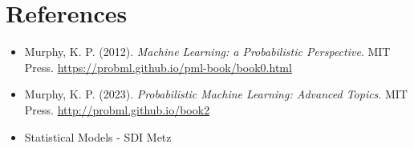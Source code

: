 \documentclass[12pt, a4paper]{article}
\theoremstyle{definition}
\numberwithin{figure}{section}
\numberwithin{equation}{section}
\numberwithin{table}{section}
\begin{document}
% 

\newpage
\section{References}
\begin{itemize}
    \item Murphy, K. P. (2012). \textit{Machine Learning: a Probabilistic Perspective}. MIT Press. \url{https://probml.github.io/pml-book/book0.html}
    \item Murphy, K. P. (2023). \textit{Probabilistic Machine Learning: Advanced Topics}. MIT Press. \url{http://probml.github.io/book2}
    \item Statistical Models - SDI Metz
\end{itemize}
\end{document}
